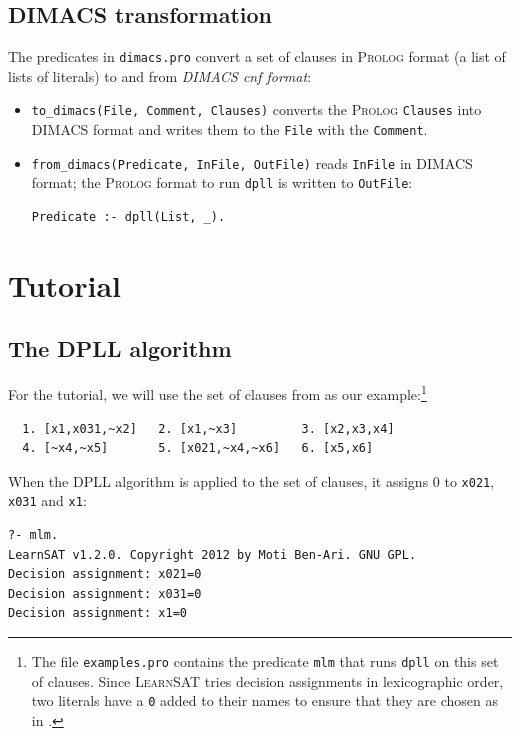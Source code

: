 \documentclass[11pt]{report}
\newcommand*{\p}[1]{\textup{\texttt{#1}}}
\newcommand*{\ls}{\textsc{LearnSAT}}
\newcommand*{\pl}{\textsc{Prolog}}
\begin{document}
\section{DIMACS transformation}

The predicates in \p{dimacs.pro} convert a set of clauses in
\pl{} format (a list of lists of literals) to and from \emph{DIMACS cnf
format}:
\begin{itemize}
\item \p{to\_dimacs(File, Comment, Clauses)} converts the \pl{}
\p{Clauses} into DIMACS format and writes them to the \p{File} with the
\p{Comment}.
\item \p{from\_dimacs(Predicate, InFile, OutFile)} reads \p{InFile} in
DIMACS format; the \pl{} format to run \p{dpll} is written to
\p{OutFile}:
\begin{verbatim}
Predicate :- dpll(List, _).
\end{verbatim}
\end{itemize}


\chapter{Tutorial}

\section{The DPLL algorithm}

For the tutorial, we will use the set of clauses from \cite{mlm} as our
example:\footnote{The file \p{examples.pro} contains the predicate
\p{mlm} that runs \p{dpll} on this set of clauses. Since \ls{} tries
decision assignments in lexicographic order, two literals have a \p{0}
added to their names to ensure that they are chosen as in \cite{mlm}.}

\begin{verbatim}
  1. [x1,x031,~x2]   2. [x1,~x3]         3. [x2,x3,x4]
  4. [~x4,~x5]       5. [x021,~x4,~x6]   6. [x5,x6]
\end{verbatim}

When the DPLL algorithm is applied to the set of clauses, it assigns
0 to \p{x021}, \p{x031} and \p{x1}:

\begin{verbatim}
?- mlm.
LearnSAT v1.2.0. Copyright 2012 by Moti Ben-Ari. GNU GPL.
Decision assignment: x021=0
Decision assignment: x031=0
Decision assignment: x1=0
\end{verbatim}
\end{document}

